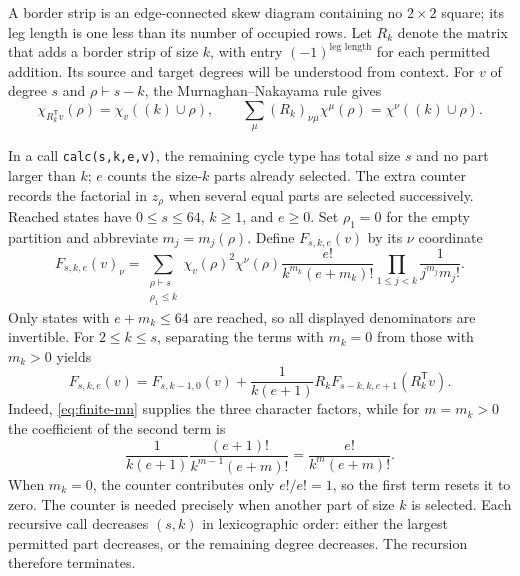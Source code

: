 A border strip is an edge-connected skew diagram containing no $2\times2$
square; its leg length is one less than its number of occupied rows.  Let
$R_k$ denote the matrix that adds a border strip of size $k$, with entry
$(-1)^{\text{leg length}}$ for each permitted addition.  Its source and target
degrees will be understood from context. For $v$ of degree $s$ and
$\rho\vdash s-k$, the Murnaghan--Nakayama rule
\cite[Chapter~I, \S7, Example~5]{Macdonald}\cite[Rule~21.1]{James} gives
\begin{equation}\label{eq:finite-mn}
  \chi_{R_k^{\mathsf T}v}(\rho)
     =\chi_v((k)\cup\rho),
  \qquad
  \sum_\mu (R_k)_{\nu\mu}\chi^\mu(\rho)
     =\chi^\nu((k)\cup\rho).
\end{equation}

In a call \texttt{calc(s,k,e,v)}, the remaining cycle type has total
size $s$ and no part larger than $k$; $e$ counts the size-$k$ parts
already selected. The extra counter records the factorial in
$z_\rho$ when several equal parts are selected successively.
Reached states have $0\le s\le64$, $k\ge1$, and $e\ge0$.
Set $\rho_1=0$ for the empty partition and abbreviate $m_j=m_j(\rho)$.
Define $F_{s,k,e}(v)$ by its $\nu$ coordinate
\begin{equation}\label{eq:finite-invariant}
 F_{s,k,e}(v)_\nu
  =\sum_{\substack{\rho\vdash s\\\rho_1\leq k}}
   \chi_v(\rho)^2\chi^\nu(\rho)
   \frac{e!}{k^{m_k}(e+m_k)!}
   \prod_{1\leq j<k}\frac{1}{j^{m_j}m_j!}.
\end{equation}
Only states with $e+m_k\leq64$ are reached, so all displayed denominators
are invertible.  For $2\leq k\leq s$, separating the terms with $m_k=0$
from those with $m_k>0$ yields
\begin{equation}\label{eq:finite-recursion}
 F_{s,k,e}(v)
   =F_{s,k-1,0}(v)
     +\frac{1}{k(e+1)}R_k
        F_{s-k,k,e+1}(R_k^{\mathsf T}v).
\end{equation}
Indeed, \eqref{eq:finite-mn} supplies the three character factors, while for
$m=m_k>0$ the coefficient of the second term is
\[
 \frac{1}{k(e+1)}
 \frac{(e+1)!}{k^{m-1}(e+m)!}
   =\frac{e!}{k^m(e+m)!}.
\]
When $m_k=0$, the counter contributes only $e!/e!=1$, so the first
term resets it to zero. The counter is needed precisely when another
part of size $k$ is selected.
Each recursive call decreases $(s,k)$ in lexicographic order: either
the largest permitted part decreases, or the remaining degree decreases.
The recursion therefore terminates.

